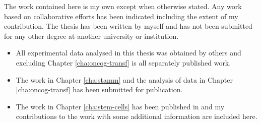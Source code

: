 \documentclass[11pt,a4paper]{report}      %
\begin{document}
\begin{thesisacknowledgments}        %




\end{thesisacknowledgments}
\begin{thesisdeclaration}        %

  The work contained here is my own except when otherwise stated. Any work based on collaborative efforts has been indicated including the extent of my contribution. The thesis has been written by myself and has not been submitted for any other degree at another university or institution.

  \begin{itemize}
  \item All experimental data analysed in this thesis was obtained by others and excluding Chapter \ref{cha:oncog-transf} is all separately published work.
  \item The work in Chapter \ref{cha:stamm} and the analysis of data in Chapter \ref{cha:oncog-transf} has been submitted for publication.
  \item The work in Chapter \ref{cha:stem-cells} has been published in \cite{Armond:2013} and my contributions to the work with some additional information are included here.
  \end{itemize}

\end{thesisdeclaration}


\begin{thesisabstract}               %
 \begin{singlespace}       %
  \end{singlespace}
\end{thesisabstract}
\end{document}
